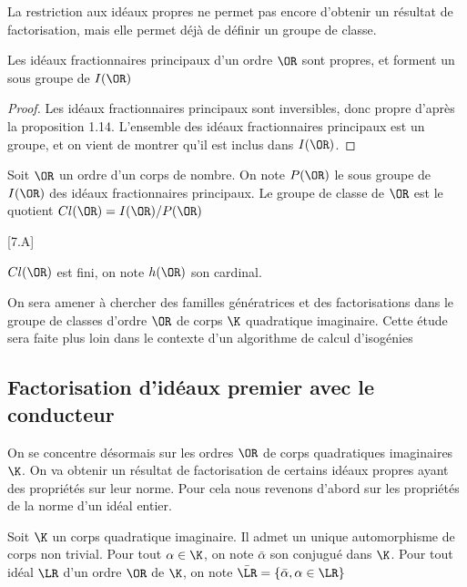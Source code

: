 La restriction aux idéaux propres ne permet pas encore d'obtenir un résultat de factorisation, mais elle permet déjà de définir un groupe de classe.

\begin{Prop}
	Les idéaux fractionnaires principaux d'un ordre $\OR$ sont propres, et forment un sous groupe de $I(\OR)$
\end{Prop}

\begin{proof}
	Les idéaux fractionnaires principaux sont inversibles, donc propre d'après la proposition 1.14. L'ensemble des idéaux fractionnaires principaux est un groupe, et on vient de montrer qu'il est inclus dans $I(\OR)$.
\end{proof}

\begin{Def}
	Soit $\OR$ un ordre d'un corps de nombre. On note $P(\OR)$ le sous groupe de $I(\OR)$ des idéaux fractionnaires principaux. Le groupe de classe de $\OR$ est le quotient $Cl(\OR) =  I(\OR)/P(\OR)$
\end{Def}

\begin{Prop}\cite{Cox}[7.A]
	
	$Cl(\OR)$ est fini, on note $h(\OR)$ son cardinal. 
\end{Prop} 

\begin{Rem}
	On sera amener à chercher des familles génératrices et des factorisations dans le groupe de classes d'ordre $\OR$ de corps $\K$ quadratique imaginaire. Cette étude sera faite plus loin dans le contexte d'un algorithme de calcul d'isogénies 
\end{Rem}







\subsection{Factorisation d'idéaux premier avec le conducteur}


On se concentre désormais sur les ordres $\OR$ de corps quadratiques imaginaires $\K$. On va obtenir un résultat de factorisation de certains idéaux propres ayant des propriétés sur leur norme. Pour cela nous revenons d'abord sur les propriétés de la norme d'un idéal entier.

\begin{Def}
	Soit $\K$ un corps quadratique imaginaire. Il admet un unique automorphisme de corps non trivial. Pour tout $\alpha\in\K$, on note $\bar{\alpha}$ son conjugué dans $\K$. Pour tout idéal $\LR$ d'un ordre $\OR$ de $\K$, on note $\bar{\LR} = \left\lbrace \bar{\alpha}, \alpha\in\LR\right\rbrace $
\end{Def}

